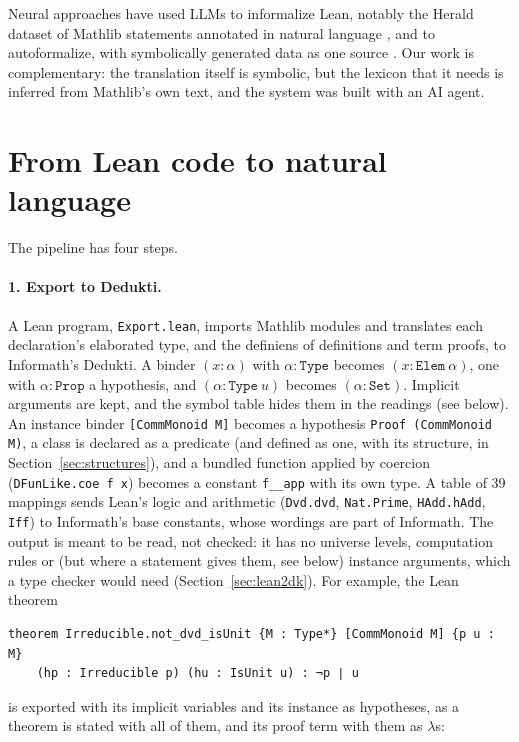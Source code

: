 \documentclass{easychair}
\newcommand{\ttt}[1]{\texttt{#1}}
\begin{document}
Neural approaches have used LLMs to informalize Lean, notably the Herald dataset of Mathlib
statements annotated in natural language \cite{gao-al-2025}, and to autoformalize, with
symbolically generated data as one source \cite{jiang-al-2024,huang-al-2025}. Our work is
complementary: the translation itself is symbolic, but the lexicon that it needs is inferred
from Mathlib's own text, and the system was built with an AI agent.

\section{From Lean code to natural language}
\label{sec:pipeline}

The pipeline has four steps.

\paragraph{1. Export to Dedukti.} A Lean program, \ttt{Export.lean}, imports Mathlib modules and
translates each declaration's elaborated type, and the definiens of definitions and term proofs,
to Informath's Dedukti. A binder $(x : \alpha)$ with $\alpha : \ttt{Type}$ becomes
$(x : \ttt{Elem}\ \alpha)$, one with $\alpha : \ttt{Prop}$ a hypothesis, and
$(\alpha : \ttt{Type}\ u)$ becomes $(\alpha : \ttt{Set})$. Implicit arguments are kept,
and the symbol table hides them in the readings (see below). An instance
binder \ttt{[CommMonoid M]} becomes a hypothesis \ttt{Proof (CommMonoid M)}, a class is
declared as a predicate (and defined as one, with its structure, in
Section~\ref{sec:structures}), and a bundled function applied by coercion (\ttt{DFunLike.coe f x})
becomes a constant \ttt{f\_\_app} with its own type. A table of 39 mappings sends Lean's logic
and arithmetic (\ttt{Dvd.dvd}, \ttt{Nat.Prime}, \ttt{HAdd.hAdd}, \ttt{Iff}) to Informath's base
constants, whose wordings are part of Informath. The output is meant to be read, not checked:
it has no universe levels, computation rules or (but where a statement gives them, see below)
instance arguments, which a type checker would need (Section~\ref{sec:lean2dk}).
For example, the Lean theorem
\begin{lstlisting}
theorem Irreducible.not_dvd_isUnit {M : Type*} [CommMonoid M] {p u : M}
    (hp : Irreducible p) (hu : IsUnit u) : ¬p ∣ u
\end{lstlisting}
is exported with its implicit variables and its instance as hypotheses, as a theorem is stated
with all of them, and its proof term with them as $\lambda$s:
\end{document}
